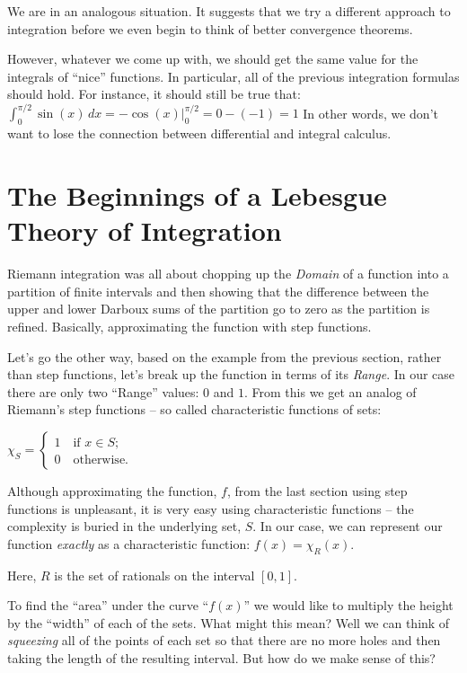 \documentclass{article}
\begin{document}
We are in an analogous situation. It suggests that 
we try a different approach to integration before we even
begin to think of better convergence theorems. 

However, whatever we come up with, we should get the same value for the 
integrals of ``nice'' functions. In particular, all of the previous integration 
formulas should hold. For instance, it should still be true that: 
$\int_0^{\pi / 2} \sin(x) \, dx = -\cos(x)|_{0}^{\pi / 2} = 0 - (-1) = 1$
In other words, we don't want to lose the connection between differential and
integral calculus.


\section{The Beginnings of a Lebesgue Theory of Integration}

Riemann integration was all about chopping up the {\em Domain\/} of a function 
into a partition of finite intervals and then showing that the difference 
between the upper and lower Darboux sums of the partition 
go to zero as the partition is refined. Basically, approximating the function 
with step functions.

Let's go the other way, based on the example from the previous section, rather 
than step functions, let's break up the function in terms of its {\em Range\/}. 
In our case there are only two ``Range'' values: $0$ and $1$. From this we get an 
analog of Riemann's step functions -- 
so called characteristic functions of sets:

$\chi_{S} = \begin{cases} 1 \quad \text{if $x \in  S$;} \\ 0 \quad \text{otherwise.} \end{cases}$

Although approximating the function, $f$, from the last section using step 
functions is unpleasant, it is very easy using characteristic functions -- the complexity 
is buried in the underlying set, $S$. In our case, we can represent our function {\em exactly\/}
as a characteristic function: $f(x) = \chi_{R}(x)$.

Here, $R$ is the set of rationals on the interval $[0, 1]$.

To find the ``area'' under the curve ``$f(x)$'' we would like to multiply the 
height by the ``width'' of each of the sets. What might this mean?
Well we can think of {\em squeezing\/} all of the points of each set so that there are 
no more holes and then taking the length of the resulting interval.
But how do we make sense of this?
\end{document}
